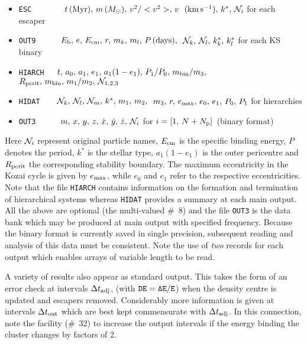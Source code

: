 \documentclass[12pt]{article}
\begin{document}
\begin{itemize}
\item {\tt ESC}~~~~~~~~$t\,({\rm Myr}),\, m \,(M_{\odot}) ,\, v^2/<v^2>,\, v\,$
$({\rm km}\,{\rm s}^{-1}),\, k^{\ast},\,{\cal N}_i$ for each escaper
\item {\tt OUT9}~~~~~~$E_{\rm b},\, e,\, E_{\rm cm},\, r,\, m_k,\, m_l,\, P \,({\rm days}),$
$\,{\cal N}_k,\, {\cal N}_l,\, k_k^{\ast},\,k_l^{\ast}$ for each KS binary
\item {\tt HIARCH}~~~$t,\,a_0,\,a_1,\,e_1,\,a_1(1-e_1),\,P_1/P_0,\,m_{\rm bin}/m_3,\,$
$R_{\rm pcrit}, \,m_{\rm bin},\,m_1/m_2,\,{\cal N}_{1,2,3}$
\item {\tt HIDAT}~~~~${\cal N}_k,\,{\cal N}_l,\,{\cal N}_m,\,k^{\ast},\,m_1,\,m_2,$
$\,m_3,\,r,\,e_{\rm max},\,e_0,\,e_1,\,P_0,\,P_1$ for hierarchies
\item {\tt OUT3}~~~~~~$m,\,x,\,y,\,z,\,{\dot x},\,{\dot y},\,{\dot z},\,{\cal N}_i$
for $i = [1,\,N + N_{\rm p}]$\, (binary format)
\end{itemize}

Here ${\cal N}_i$ represent original particle names, $E_{\rm cm}$ is the
specific \cm binding energy, $P$ denotes the period, $k^{\ast}$ is the
stellar type, $a_1 (1 - e_1)$ is the outer pericentre and $R_{\rm pcrit}$
the corresponding stability boundary.
The maximum eccentricity in the Kozai cycle is given by $e_{\rm max}$, while
$e_0$ and $e_1$ refer to the respective eccentricities.
Note that the file {\tt HIARCH} contains information on the formation and
termination of hierarchical systems whereas {\tt HIDAT} provides a summary
at each main output.
All the above are optional (\cf the multi-valued \#~8) and the file
{\tt OUT3} is the data bank which may be produced at main output with
specified frequency.
Because the binary format is currently saved in single precision, subsequent
reading and analysis of this data must be consistent.
Note the use of {\it two} records for each output which enables arrays of
variable length to be read.

A variety of results also appear as standard output.
This takes the form of an error check at intervals ${\Delta t}_{\rm adj}$,
(with ${\tt DE = \Delta E/E}$) when the density centre is updated and
escapers removed.
Considerably more information is given at intervals ${\Delta t}_{\rm out}$
which are best kept commensurate with ${\Delta t}_{\rm adj}$.
In this connection, note the facility (\#~32) to increase the output
intervals if the energy binding the cluster changes by factors of 2.
\end{document}

